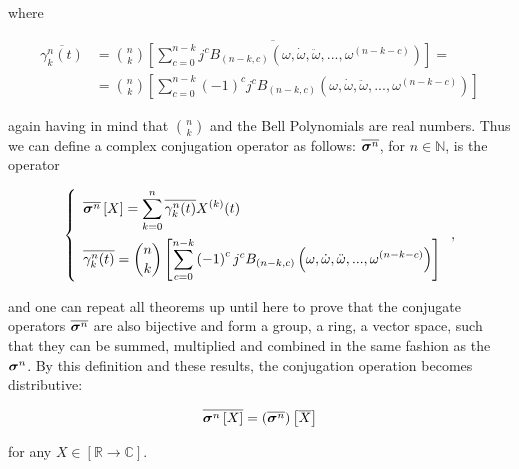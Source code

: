	\noindent where

\begin{align}
	\overline{\gamma_k^n(t)} &= \overline{{n\choose k} \left[\sum\limits_{c=0}^{n-k} j^c B_{\left(n-k,c\right)}\left(\omega,\dot{\omega},\ddot{\omega},...,\omega^{(n-k-c)}\right) \right]} = \nonumber\\[3mm] &= {n\choose k} \left[\sum\limits_{c=0}^{n-k} \left(-1\right)^c j^c B_{\left(n-k,c\right)}\left(\omega,\dot{\omega},\ddot{\omega},...,\omega^{(n-k-c)}\right) \right] 
\end{align}

	\noindent again having in mind that ${n\choose k}$ and the Bell Polynomials are real numbers. Thus we can define a complex conjugation operator as follows: $\overline{\boldsymbol{\sigma}^{n}}$, for $n\in\mathbb{N}$, is the operator

\begin{equation}\left\{\begin{array}{l} \overline{\boldsymbol{\sigma}^{n}}\left[X\right] = \displaystyle\sum\limits_{k=0}^n \overline{\gamma_k^n(t)} X^{(k)}(t) \\[5mm] \displaystyle \overline{\gamma_k^n(t)} = {n\choose k} \left[\sum\limits_{c=0}^{n-k} \left(-1\right)^c j^cB_{\left(n-k,c\right)}\left(\omega,\dot{\omega},\ddot{\omega},...,\omega^{(n-k-c)}\right) \right]\end{array}\right. ,\label{eq:gamma_def_conj}\end{equation}

	\noindent and one can repeat all theorems up until here to prove that the conjugate operators $\overline{\boldsymbol{\sigma}^{n}}$ are also bijective and form a group, a ring, a vector space, such that they can be summed, multiplied and combined in the same fashion as the $\boldsymbol{\sigma}^{n}$. By this definition and these results, the conjugation operation becomes distributive:

\begin{equation} \overline{\boldsymbol{\sigma}^{n}\left[X\right]} = \left(\overline{\boldsymbol{\sigma}^{n}}\right)\left[\overline{X}\right] \label{eq:ndpo_conj}\end{equation}

	\noindent for any $X\in\left[\mathbb{R}\to\mathbb{C}\right]$.

